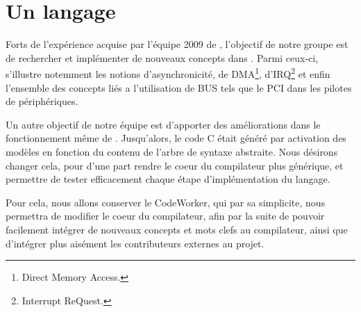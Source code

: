 \documentclass{rtxreport}
\begin{document}
\section{Un langage}

Forts de l'expérience acquise par l'équipe 2009 de \rtx, l'objectif de
notre groupe est de rechercher et implémenter de nouveaux concepts dans
\rtx. Parmi ceux-ci, s'illustre notemment les notions d'asynchronicité,
de DMA\footnote{Direct Memory Access.}, d'IRQ\footnote{Interrupt ReQuest.} et
enfin l'ensemble des concepts liés a l'utilisation de BUS tels que le PCI dans
les pilotes de périphériques.

Un autre objectif de notre équipe est d'apporter des améliorations dans le
fonctionnement même de \rtx. Jusqu'alors, le code C était généré par
activation des modèles en fonction du contenu de l'arbre de syntaxe abstraite.
Nous désirons changer cela, pour d'une part rendre le coeur du compilateur
plus générique, et permettre de tester efficacement chaque étape
d'implémentation du langage.

Pour cela, nous allons conserver le CodeWorker, qui par sa simplicite, nous
permettra de modifier le coeur du compilateur, afin par la suite de pouvoir
facilement intégrer de nouveaux concepts et mots clefs au compilateur,
ainsi que d'intégrer plus aisément les contributeurs externes au projet.
\end{document}
